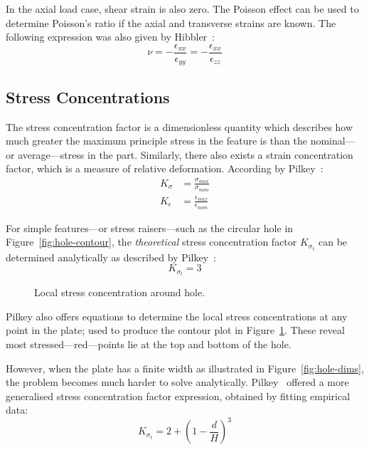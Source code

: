 \documentclass[a4paper,11pt,twocolumn]{article}
\begin{document}
{In the axial load case, shear strain is also zero. The Poisson
effect can be used to determine Poisson's ratio if the axial and
transverse strains are known. The following expression was also given by
Hibbler~\cite[p.~106]{hibbeler2017mechanics}:
\begin{equation} \label{eq:poisson}
    \nu = -\frac{\epsilon_{xx}}{\epsilon_{yy}} 
        = -\frac{\epsilon_{xx}}{\epsilon_{zz}}
\end{equation}

\subsection{Stress Concentrations}

The stress concentration factor is a dimensionless quantity which describes how
much greater the maximum principle stress in the feature is than the 
nominal---or  average---stress in the part. Similarly, there also exists a 
strain concentration factor, which is a measure of relative deformation.
According by Pilkey~\cite[p.~4]{pilkey2008peterson}:
\begin{align}
    \label{eq:stress-conc}
    K_\sigma &= \frac{\sigma_{max}}{\sigma_{nom}} \\
    \label{eq:strain-conc}
    K_\epsilon &= \frac{\epsilon_{max}}{\epsilon_{nom}}
\end{align}

For simple features---or stress raisers---such as the 
circular hole in Figure~\vref{fig:hole-contour}, the \emph{theoretical} stress
concentration factor $K_{\sigma_t}$ can be determined analytically as described
by Pilkey~\cite[p.~181]{pilkey2008peterson}:
\begin{equation} \label{eq:inf-hole-conc}
    K_{\sigma_t} = 3
\end{equation}

\begin{figure}[h]
    \centering
    \def\svgwidth{0.48\textwidth}
    
    \caption{Local stress concentration around hole.}
    \label{fig:hole-contour}
\end{figure}

Pilkey also offers equations to determine the local stress concentrations at
any point in the plate; used to produce the contour plot in 
Figure~\ref{fig:hole-contour}. These reveal most stressed---red---points lie
at the top and bottom of the hole.

However, when the plate has a finite width as illustrated in 
Figure~\vref{fig:hole-dims}, the problem becomes much harder to solve
analytically. Pilkey~\cite[p.~183]{pilkey2008peterson} offered a more
generalised stress concentration factor expression, obtained by fitting
empirical data:
\begin{equation} \label{eq:hole-conc}
    K_{\sigma_t} = 2 + \left(1 - \frac{d}{H}\right)^3
\end{equation}

}
\end{document}
